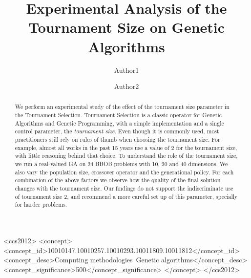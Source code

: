 \documentclass[sigconf, authordraft]{acmart}
\begin{document}
\title{Experimental Analysis of the Tournament Size on Genetic Algorithms}

\author{Author1}

\author{Author2}

\begin{abstract}
We perform an experimental study of the effect of the tournament size
parameter in the Tournament Selection. Tournament Selection is a
classic operator for Genetic Algorithms and Genetic Programming, with
a simple implementation and a single control parameter, the
\emph{tournament size}. Even though it is commonly used, most
practitioners still rely on rules of thumb when choosing the
tournament size. For example, almost all works in the past 15 years
use a value of 2 for the tournament size, with little reasoning behind
that choice.  To understand the role of the tournament size, we run a
real-valued GA on 24 BBOB problems with 10, 20 and 40 dimensions. We
also vary the population size, crossover operator and the generational
policy. For each combination of the above factors we observe how
the quality of the final solution changes with the tournament size.
Our findings do not support the indiscriminate use of tournament size
2, and recommend a more careful set up of this parameter, specially
for harder problems.
\end{abstract}

\begin{CCSXML}
<ccs2012>
<concept>
<concept_id>10010147.10010257.10010293.10011809.10011812</concept_id>
<concept_desc>Computing methodologies~Genetic algorithms</concept_desc>
<concept_significance>500</concept_significance>
</concept>
</ccs2012>
\end{CCSXML}




\maketitle

%

 






 
\end{document}
